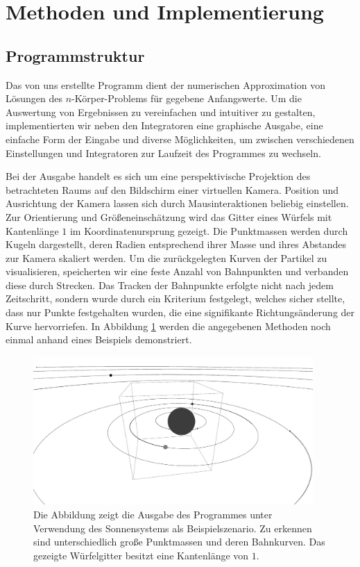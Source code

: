 \section{Methoden und Implementierung} %
\label{sec:methoden_und_implementierung}

  \subsection{Programmstruktur} %
  \label{sub:strukturen}

    Das von uns erstellte Programm dient der numerischen Approximation von Lösungen des $n$-Körper-Problems für gegebene Anfangswerte.
    Um die Auswertung von Ergebnissen zu vereinfachen und intuitiver zu gestalten, implementierten wir neben den Integratoren eine graphische Ausgabe, eine einfache Form der Eingabe und diverse Möglichkeiten, um zwischen verschiedenen Einstellungen und Integratoren zur Laufzeit des Programmes zu wechseln.

    Bei der Ausgabe handelt es sich um eine perspektivische Projektion des betrachteten Raums auf den Bildschirm einer virtuellen Kamera.
    Position und Ausrichtung der Kamera lassen sich durch Mausinteraktionen beliebig einstellen.
    Zur Orientierung und Größeneinschätzung wird das Gitter eines Würfels mit Kantenlänge $1$ im Koordinatenursprung gezeigt.
    Die Punktmassen werden durch Kugeln dargestellt, deren Radien entsprechend ihrer Masse und ihres Abstandes zur Kamera skaliert werden.
    Um die zurückgelegten Kurven der Partikel zu visualisieren, speicherten wir eine feste Anzahl von Bahnpunkten und verbanden diese durch Strecken.
    Das Tracken der Bahnpunkte erfolgte nicht nach jedem Zeitschritt, sondern wurde durch ein Kriterium festgelegt, welches sicher stellte, dass nur Punkte festgehalten wurden, die eine signifikante Richtungsänderung der Kurve hervorriefen.
    In Abbildung \ref{fig:program_example} werden die angegebenen Methoden noch einmal anhand eines Beispiels demonstriert.

    \begin{figure}[h]
      \center
      \includegraphics[width=0.95\textwidth]{pictures/program_example.jpg}
      \caption{Die Abbildung zeigt die Ausgabe des Programmes unter Verwendung des Sonnensystems als Beispielszenario. Zu erkennen sind unterschiedlich große Punktmassen und deren Bahnkurven. Das gezeigte Würfelgitter besitzt eine Kantenlänge von $1$.}
      \label{fig:program_example}
    \end{figure}

